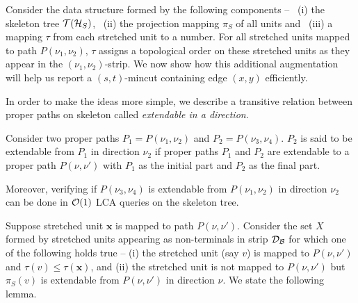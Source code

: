 Consider the data structure formed by the following components -- ~(i) the skeleton tree ${\cal T}({\cal H}_S)$, ~(ii) the projection mapping $\pi_S$ of all units and ~(iii) a mapping $\tau$ from each stretched unit to a number. For all stretched units mapped to path $P(\nu_1,\nu_2)$, $\tau$ assigns a topological order on these stretched units as they appear in the $(\nu_1,\nu_2)$-strip. We now show how this additional augmentation will help us report a $(s,t)$-mincut containing edge $(x,y)$ efficiently.


In order to make the ideas more simple, we describe a transitive relation between proper paths on skeleton called \textit{extendable in a direction}.


\begin{definition}[Extendable in a direction]
Consider two proper paths $P_1 = P(\nu_1,\nu_2)$ and $P_2 = P(\nu_3,\nu_4)$. $P_2$ is said to be extendable from $P_1$ in direction $\nu_2$ if proper paths $P_1$ and $P_2$ are extendable to a proper path $P(\nu,\nu')$ with $P_1$ as the initial part and $P_2$ as the final part.
\label{def:extendable}
\end{definition}

Moreover, verifying if $P(\nu_3,\nu_4)$ is extendable from $P(\nu_1,\nu_2)$ in direction $\nu_2$ can be done in ${\cal O}(1)$ LCA queries on the skeleton tree.


Suppose stretched unit $\mathbf x$ is mapped to path $P(\nu,\nu')$. Consider the set $X$ formed by stretched units appearing as non-terminals in strip ${\cal D}_{\cal B}$ for which one of the following holds true -- (i) the stretched unit (say $v$) is mapped to $P(\nu,\nu')$ and $\tau(v) \leq \tau(\mathbf x)$, and (ii) the stretched unit is not mapped to $P(\nu,\nu')$ but $\pi_S(v)$ is extendable from $P(\nu,\nu')$ in direction $\nu$. We state the following lemma.

